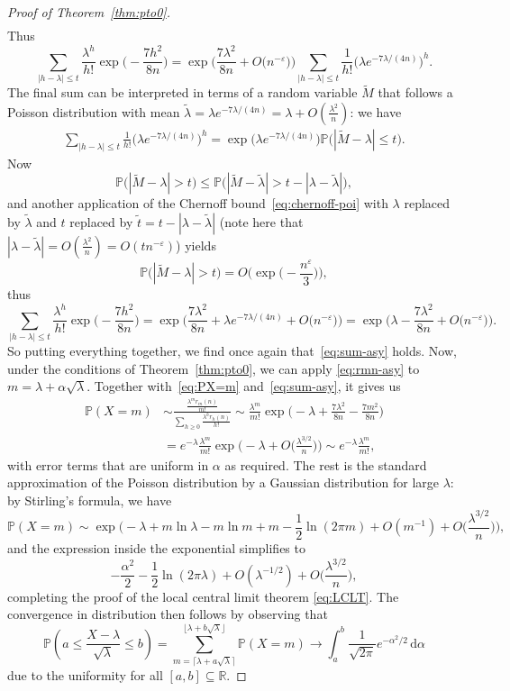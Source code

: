 \documentclass[a4paper,12pt,reqno]{amsart}
\theoremstyle{remark}
\newcommand{\IP}{\mathbb{P}}
\newcommand{\ssq}{\subseteq}
\newcommand{\ga}{\alpha}
\newcommand{\gep}{\varepsilon}
\newcommand{\gl}{\lambda}
\newcommand{\IR}{\mathbb{R}}
\begin{document}
\begin{proof}[Proof of Theorem~\ref{thm:pto0}]
\begin{align*}
\end{align*}
Thus
\[\sum_{|h-\gl| \leq t} \frac{\gl^h}{h!} \exp \Big( {-}\frac{7h^2}{8n} \Big)
= \exp \Big( \frac{7\gl^2}{8n} + O \big( n^{-\gep} \big) \Big) \sum_{|h-\gl| \leq t} \frac{1}{h!} \big( \gl e^{-7\gl/(4n)} \big)^h.\]
The final sum can be interpreted in terms of a random variable $\tilde{M}$ that follows a Poisson distribution with mean $\tilde{\gl} = \gl e^{-7\gl/(4n)}  = \gl + O (\frac{\gl^2}{n})$: we have
\begin{align*}
    \sum_{|h-\gl| \leq t} \frac{1}{h!} \big( \gl e^{-7\gl/(4n)} \big)^h = \exp \Big( \gl e^{-7\gl/(4n)} \Big) \IP \Big( |\tilde{M} - \gl| \leq t \Big).
\end{align*}
Now
\[\IP \Big( |\tilde{M} - \gl| > t \Big) \leq \IP \Big( |\tilde{M} - \tilde{\gl}| > t - |\gl - \tilde{\gl}|\Big),\]
and another application of the Chernoff bound~\eqref{eq:chernoff-poi} with $\gl$ replaced by $\tilde{\gl}$ and $t$ replaced by $\tilde{t} = t - |\gl - \tilde{\gl}|$ (note here that $|\gl - \tilde{\gl}| = O(\frac{\gl^2}{n}) = O(tn^{-\gep})$) yields
\[\IP \Big( |\tilde{M} - \gl| > t \Big) = O \Big( \exp \Big( {-} \frac{n^{\gep}}{3} \Big) \Big),\]
thus
\[\sum_{|h-\gl| \leq t} \frac{\gl^h}{h!} \exp \Big( {-}\frac{7h^2}{8n} \Big)
= \exp \Big( \frac{7\gl^2}{8n} + \gl e^{-7\gl/(4n)} + O \big( n^{-\gep} \big) \Big) = \exp \Big( \gl - \frac{7\gl^2}{8n} + O \big( n^{-\gep} \big) \Big).\]
So putting everything together, we find once again that~\eqref{eq:sum-asy} holds. Now, under the conditions of Theorem~\ref{thm:pto0}, we can apply \eqref{eq:rmn-asy} to $m = \gl + \ga \sqrt{\gl}$. Together with~\eqref{eq:PX=m} and~\eqref{eq:sum-asy}, it gives us
\begin{align*}
\IP(X = m) &\sim \frac{\frac{\gl^mr_m(n)}{m!}}{\sum_{h \geq 0} 
\frac{\gl^hr_h(n)}{h!}} \sim \frac{\gl^m}{m!} \exp \Big( {-} \gl + \frac{7\gl^2}{8n} - \frac{7m^2}{8n} \Big) \\
&= e^{-\gl} \frac{\gl^m}{m!} \exp \Big( {-} \gl + O \Big( \frac{\gl^{3/2}}{n} \Big) \Big) \sim e^{-\gl} \frac{\gl^m}{m!},    
\end{align*}
with error terms that are uniform in $\ga$ as required. The rest is the standard approximation of the Poisson distribution by a Gaussian distribution for large $\gl$: by Stirling's formula, we have
\[\IP(X = m) \sim \exp \Big( {-}\gl + m \ln \gl - m \ln m + m - \frac12 \ln(2\pi m) + O(m^{-1}) + O \Big( \frac{\gl^{3/2}}{n} \Big) \Big),\]
and the expression inside the exponential simplifies to 
\[- \frac{\ga^2}{2} - \frac12 \ln(2\pi \gl) + O (\gl^{-1/2}) + O \Big( \frac{\gl^{3/2}}{n} \Big),\]
completing the proof of the local central limit theorem \eqref{eq:LCLT}. The convergence in distribution then follows by observing that 
 \[
  \IP\left(a\leq \frac{X-\gl}{\sqrt{\gl}}\leq b\right) 
  = \sum_{m=\lceil\gl+a\sqrt{\gl}\rceil}^{\lfloor \gl+b\sqrt{\gl}\rfloor} \IP(X=m) 
  \to \int_a^b \frac{1}{\sqrt{2\pi}} e^{-\ga^2/2} \,\mathrm{d}\ga
 \]
 due to the uniformity for all $[a,b]\ssq \IR$.
\end{proof}
\end{document}
